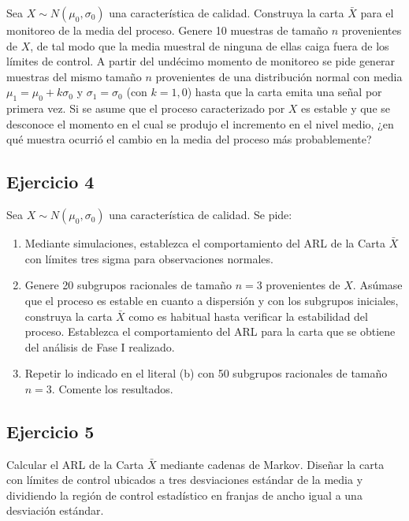 \documentclass{article}
\begin{document}
Sea \(X \sim N(\mu_0, \sigma_0)\) una característica de calidad.
Construya la carta \(\bar{X}\) para el monitoreo de la media del
proceso. Genere 10 muestras de tamaño \(n\) provenientes de \(X\), de
tal modo que la media muestral de ninguna de ellas caiga fuera de los
límites de control. A partir del undécimo momento de monitoreo se pide
generar muestras del mismo tamaño \(n\) provenientes de una distribución
normal con media \(\mu_1 = \mu_0 + k\sigma_0\) y \(\sigma_1 = \sigma_0\)
(con \(k = 1,0\)) hasta que la carta emita una señal por primera vez. Si
se asume que el proceso caracterizado por \(X\) es estable y que se
desconoce el momento en el cual se produjo el incremento en el nivel
medio, ¿en qué muestra ocurrió el cambio en la media del proceso más
probablemente?

\hypertarget{ejercicio-4}{%
\subsection{Ejercicio 4}\label{ejercicio-4}}

Sea \(X \sim N(\mu_0, \sigma_0)\) una característica de calidad. Se
pide:\\

\begin{enumerate}
  \item Mediante simulaciones, establezca el comportamiento del ARL de la Carta $\bar{X}$ con límites tres sigma para observaciones normales.
  \item Genere 20 subgrupos racionales de tamaño $n = 3$ provenientes de $X$. Asúmase que el proceso es estable en cuanto a dispersión y con los subgrupos iniciales, construya la carta $\bar{X}$ como es habitual hasta verificar la estabilidad del proceso. Establezca el comportamiento del ARL para la carta que se obtiene del análisis de Fase I realizado.
  \item Repetir lo indicado en el literal (b) con 50 subgrupos racionales de tamaño $n = 3$. Comente los resultados.
\end{enumerate}

\hypertarget{ejercicio-5}{%
\subsection{Ejercicio 5}\label{ejercicio-5}}

Calcular el ARL de la Carta \(\bar{X}\) mediante cadenas de Markov.
Diseñar la carta con límites de control ubicados a tres desviaciones
estándar de la media y dividiendo la región de control estadístico en
franjas de ancho igual a una desviación estándar.



\end{document}
